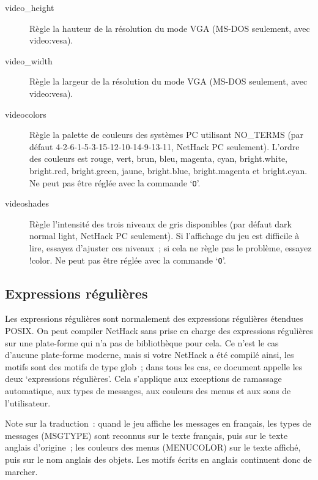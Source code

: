\documentclass[titlepage]{article}
\begin{document}
\begin{description}
\item[{video\_height}]
Règle la hauteur de la résolution du mode VGA (MS-DOS seulement, avec
video:vesa).

\item[{video\_width}]
Règle la largeur de la résolution du mode VGA (MS-DOS seulement, avec
video:vesa).

\item[{videocolors}]
Règle la palette de couleurs des systèmes PC utilisant NO\_TERMS (par
défaut 4-2-6-1-5-3-15-12-10-14-9-13-11, NetHack PC seulement).
L'ordre des couleurs est rouge, vert, brun, bleu, magenta, cyan,
bright.white, bright.red, bright.green, jaune, bright.blue, bright.magenta
et bright.cyan.
Ne peut pas être réglée avec la commande `\texttt{O}'.

\item[{videoshades}]
Règle l'intensité des trois niveaux de gris disponibles (par défaut dark
normal light, NetHack PC seulement).
Si l'affichage du jeu est difficile à lire, essayez d'ajuster ces niveaux~;
si cela ne règle pas le problème, essayez !color.
Ne peut pas être réglée avec la commande `\texttt{O}'.

\end{description}
\subsection{Expressions régulières}



Les expressions régulières sont normalement des expressions régulières
étendues POSIX.
On peut compiler NetHack sans prise en charge des expressions régulières
sur une plate-forme qui n'a pas de bibliothèque pour cela.
Ce n'est le cas d'aucune plate-forme moderne, mais si votre NetHack a été
compilé ainsi, les motifs sont des motifs de type glob~; dans tous les cas,
ce document appelle les deux `expressions régulières'.
Cela s'applique aux exceptions de ramassage automatique, aux types de
messages, aux couleurs des menus et aux sons de l'utilisateur.


Note sur la traduction~: quand le jeu affiche les messages en français,
les types de messages (MSGTYPE) sont reconnus sur le texte français, puis
sur le texte anglais d'origine~; les couleurs des menus (MENUCOLOR) sur le
texte affiché, puis sur le nom anglais des objets.
Les motifs écrits en anglais continuent donc de marcher.
\end{document}
